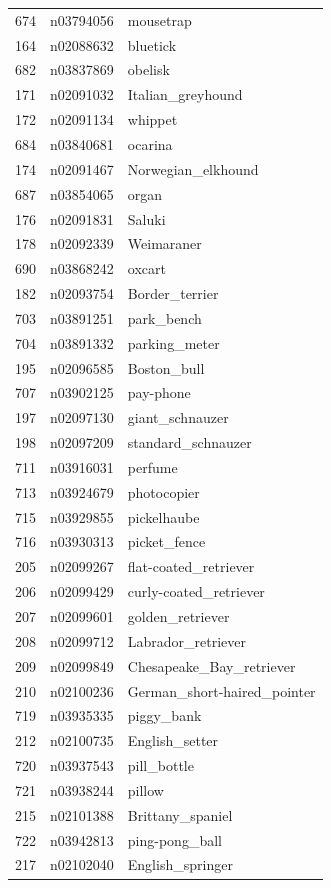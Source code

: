 \begin{table}
\begin{tabular}{cll}
674 & n03794056 & mousetrap \\
164 & n02088632 & bluetick \\
682 & n03837869 & obelisk \\
171 & n02091032 & Italian_greyhound \\
172 & n02091134 & whippet \\
684 & n03840681 & ocarina \\
174 & n02091467 & Norwegian_elkhound \\
687 & n03854065 & organ \\
176 & n02091831 & Saluki \\
178 & n02092339 & Weimaraner \\
690 & n03868242 & oxcart \\
182 & n02093754 & Border_terrier \\
703 & n03891251 & park_bench \\
704 & n03891332 & parking_meter \\
195 & n02096585 & Boston_bull \\
707 & n03902125 & pay-phone \\
197 & n02097130 & giant_schnauzer \\
198 & n02097209 & standard_schnauzer \\
711 & n03916031 & perfume \\
713 & n03924679 & photocopier \\
715 & n03929855 & pickelhaube \\
716 & n03930313 & picket_fence \\
205 & n02099267 & flat-coated_retriever \\
206 & n02099429 & curly-coated_retriever \\
207 & n02099601 & golden_retriever \\
208 & n02099712 & Labrador_retriever \\
209 & n02099849 & Chesapeake_Bay_retriever \\
210 & n02100236 & German_short-haired_pointer \\
719 & n03935335 & piggy_bank \\
212 & n02100735 & English_setter \\
720 & n03937543 & pill_bottle \\
721 & n03938244 & pillow \\
215 & n02101388 & Brittany_spaniel \\
722 & n03942813 & ping-pong_ball \\
217 & n02102040 & English_springer \\

\end{tabular}
\end{table}
